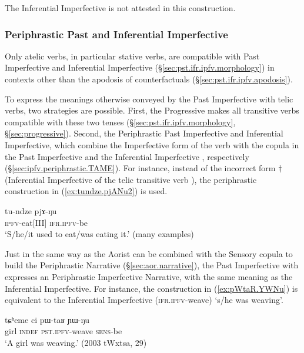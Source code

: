 The Inferential Imperfective is not attested in this construction.

\subsubsection{Periphrastic Past and Inferential Imperfective} \label{sec:pst.ifr.ipfv.periphrastic}
Only atelic verbs, in particular stative verbs, are compatible with Past Imperfective and Inferential Imperfective (§\ref{sec:pst.ifr.ipfv.morphology}) in contexts other than the apodosis of counterfactuals (§\ref{sec:pst.ifr.ipfv.apodosis}).

To express the meanings otherwise conveyed by the Past Imperfective with telic verbs, two strategies are possible. First, the Progressive  makes all transitive verbs compatible with these two tenses (§\ref{sec:pst.ifr.ipfv.morphology}, §\ref{sec:progressive}). Second, the Periphrastic Past Imperfective and Inferential Imperfective, which combine the Imperfective form of the verb with the copula in the Past Imperfective  and the Inferential Imperfective , respectively (§\ref{sec:ipfv.periphrastic.TAME}). For instance, instead of the incorrect form $\dagger$ (Inferential Imperfective of the telic transitive verb ), the periphrastic construction in (\ref{ex:tundze.pjANu2}) is used.


\begin{exe}
\ex \label{ex:tundze.pjANu2}
\gll  tu-ndze pjɤ-ŋu \\
\textsc{ipfv}-eat[III] \textsc{ifr}.\textsc{ipfv}-be \\
\glt `S/he/it used to eat/was eating it.' (many examples)
\end{exe}


Just in the same way as the Aorist can be combined with the Sensory copula  to build the Periphrastic Narrative (§\ref{sec:aor.narrative}), the Past Imperfective with  expresses an Periphrastic Imperfective Narrative, with the same meaning as the Inferential Imperfective. For instance, the construction in (\ref{ex:pWtaR.YWNu}) is equivalent to the Inferential Imperfective  (\textsc{ifr}.\textsc{ipfv}-weave) `s/he was weaving'.

\begin{exe}
\ex \label{ex:pWtaR.YWNu}
\gll tɕʰeme ci pɯ-taʁ ɲɯ-ŋu \\
girl \textsc{indef} \textsc{pst}.\textsc{ipfv}-weave \textsc{sens}-be \\
\glt `A girl was weaving.' (2003 tWxtsa, 29)
\end{exe}

